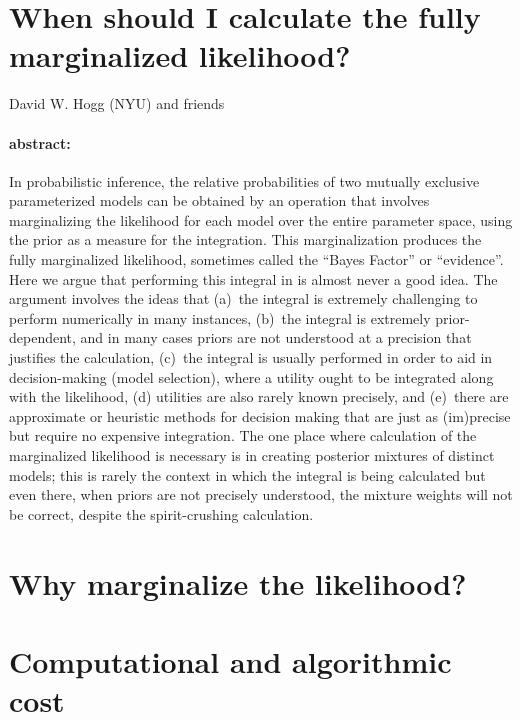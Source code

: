 \documentclass[12pt]{article}
\begin{document}
\section*{When should I calculate the fully marginalized likelihood?}

\noindent
David W. Hogg (NYU) and friends

\paragraph{abstract:}
In probabilistic inference, the relative probabilities of two mutually
exclusive parameterized models can be obtained by an operation that
involves marginalizing the likelihood for each model over the entire
parameter space, using the prior as a measure for the integration.
This marginalization produces the fully marginalized likelihood,
sometimes called the ``Bayes Factor'' or ``evidence''.  Here we argue
that performing this integral in is almost never a good idea.  The
argument involves the ideas that (a)~the integral is extremely
challenging to perform numerically in many instances, (b)~the integral
is extremely prior-dependent, and in many cases priors are not
understood at a precision that justifies the calculation, (c)~the
integral is usually performed in order to aid in decision-making
(model selection), where a utility ought to be integrated along with
the likelihood, (d) utilities are also rarely known precisely, and
(e)~there are approximate or heuristic methods for decision making
that are just as (im)precise but require no expensive integration.
The one place where calculation of the marginalized likelihood is
necessary is in creating posterior mixtures of distinct models; this
is rarely the context in which the integral is being calculated but
even there, when priors are not precisely understood, the mixture
weights will not be correct, despite the spirit-crushing calculation.

\section{Why marginalize the likelihood?}


\section{Computational and algorithmic cost}
\end{document}

